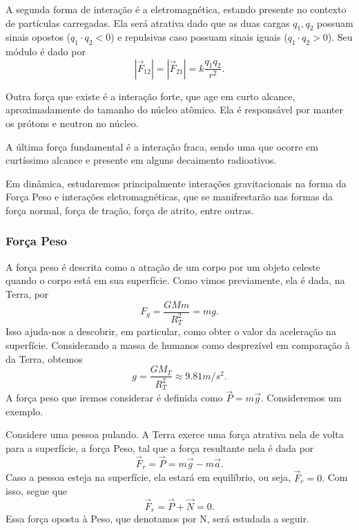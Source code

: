 \documentclass[physics_notes.tex]{subfiles}
\begin{document}
A segunda forma de interação é a eletromagnética, estando presente no contexto de partículas carregadas. Ela será
atrativa dado que as duas cargas $q_{1}, q_{2}$ possuam sinais opostos ($q_{1}\cdot q_{2}<0$) e repulsivas caso possuam sinais
iguais ($q_{1}\cdot q_{2}>0$). Seu módulo é dado por
$$
	|\vec{F}_{12}|=|\vec{F}_{21}|=k\frac{q_{1}q_{2}}{r^{2}}.
$$

Outra força que existe é a interação forte, que age em curto alcance, aproximadamente do tamanho do núcleo atômico.
Ela é responsável por manter os prótons e neutron no núcleo.

A última força fundamental é a interação fraca, sendo uma que ocorre em curtíssimo alcance e presente em alguns
decaimento radioativos.

Em dinâmica, estudaremos principalmente interações gravitacionais na forma da Força Peso e interações eletromagnéticas,
que se manifrestarão nas formas da força normal, força de tração, força de atrito, entre outras.

\subsubsection{Força Peso}
A força peso é descrita como a atração de um corpo por um objeto celeste quando o corpo está em sua superfície.
Como vimos previamente, ela é dada, na Terra, por
$$
	F_{g} = \frac{GMm}{R_{T}^{2}} = mg.
$$
Isso ajuda-nos a descobrir, em particular, como obter o valor da aceleração na superfície. Considerando a massa
de humanos como desprezível em comparação à da Terra, obtemos
$$
	g = \frac{GM_{T}}{R_{T}^{2}}\approx 9.81m/s^{2}.
$$
A força peso que iremos considerar é definida como $\vec{P} = m \vec{g}$. Consideremos um exemplo.

\begin{example}
	Considere uma pessoa pulando. A Terra exerce uma força atrativa nela de volta para a superfície, a força Peso, tal que
	a força resultante nela é dada por
	$$
		\vec{F}_r = \vec{P} = m \vec{g} - m \vec{a}.
	$$
	Caso a pessoa esteja na superfície, ela estará em equilíbrio, ou seja, $\vec{F}_{r} = 0.$ Com isso, segue que
	$$
		\vec{F}_{r} = \vec{P} + \vec{N} = 0.
	$$
	Essa força oposta à Peso, que denotamos por N, será estudada a seguir.
\end{example}
\end{document}
